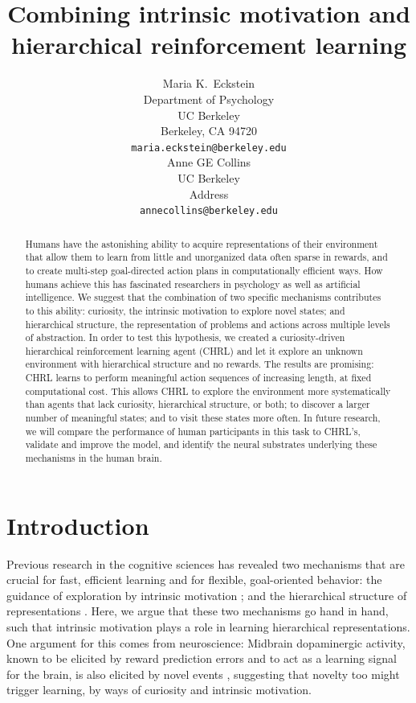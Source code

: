 \documentclass{article}
\title{Combining intrinsic motivation and hierarchical reinforcement learning}
\author{
  Maria K.~Eckstein \\
  Department of Psychology \\
  UC Berkeley \\
  Berkeley, CA 94720 \\
  \texttt{maria.eckstein@berkeley.edu} \\  
  \And
  Anne GE Collins \\
  UC Berkeley \\
  Address \\
  \texttt{annecollins@berkeley.edu} \\
}
\begin{document}
\maketitle

\begin{abstract}
    Humans have the astonishing ability to acquire representations of their environment that allow them to learn from little and unorganized data often sparse in rewards, and to create multi-step goal-directed action plans in computationally efficient ways. How humans achieve this has fascinated researchers in psychology as well as artificial intelligence. We suggest that the combination of two specific mechanisms contributes to this ability: curiosity, the intrinsic motivation to explore novel states; and hierarchical structure, the representation of problems and actions across multiple levels of abstraction. In order to test this hypothesis, we created a curiosity-driven hierarchical reinforcement learning agent (CHRL) and let it explore an unknown environment with hierarchical structure and no rewards. The results are promising: CHRL learns to perform meaningful action sequences of increasing length, at fixed computational cost. This allows CHRL to explore the environment more systematically than agents that lack curiosity, hierarchical structure, or both; to discover a larger number of meaningful states; and to visit these states more often. In future research, we will compare the performance of human participants in this task to CHRL's, validate and improve the model, and identify the neural substrates underlying these mechanisms in the human brain.
\end{abstract}


\section{Introduction}

Previous research in the cognitive sciences has revealed two mechanisms that are crucial for fast, efficient learning and for flexible, goal-oriented behavior: the guidance of exploration by intrinsic motivation \cite{gopnik_scientific_2012, schmidhuber_formal_2010, lepper_undermining_1973, pathak_curiosity-driven_2017}; and the hierarchical structure of representations \cite{collins_reasoning_2012, anderson_act:_1996, miller_integrative_2001, frank_mechanisms_2012, chase_perception_1973, botvinick_model-based_2014}. Here, we argue that these two mechanisms go hand in hand, such that intrinsic motivation plays a role in learning hierarchical representations. One argument for this comes from neuroscience: Midbrain dopaminergic activity, known to be elicited by reward prediction errors \cite{schultz_neural_1997} and to act as a learning signal for the brain, is also elicited by novel events \cite{wittmann_striatal_2008}, suggesting that novelty too might trigger learning, by ways of curiosity and intrinsic motivation.
\end{document}
